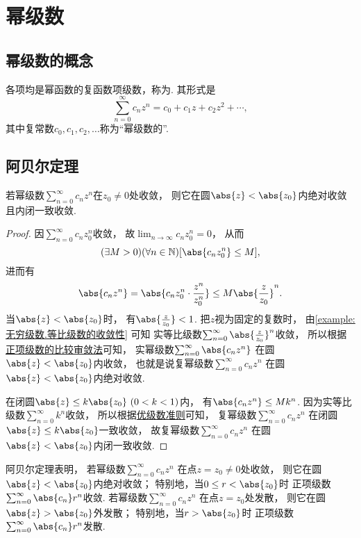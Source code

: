 \section{幂级数}
\subsection{幂级数的概念}
\begin{definition}
各项均是幂函数的复函数项级数，称为.
其形式是\begin{equation*}
	\sum_{n=0}^\infty c_n z^n
	= c_0 + c_1 z + c_2 z^2 + \dotsb,
\end{equation*}
其中复常数\(c_0,c_1,c_2,\dotsc\)称为“幂级数的”.
\end{definition}

\subsection{阿贝尔定理}
\begin{theorem}[阿贝尔定理]\label{theorem:解析函数的级数表示.阿贝尔定理}
若幂级数\(\sum_{n=0}^\infty c_n z^n\)在\(z_0 \neq 0\)处收敛，
则它在圆\(\abs{z} < \abs{z_0}\)内绝对收敛且内闭一致收敛.
\begin{proof}
因\(\sum_{n=0}^\infty c_n z_0^n\)收敛，
故\(\lim_{n\to\infty} c_n z_0^n = 0\)，
从而\begin{equation*}
	(\exists M > 0)
	(\forall n \in \mathbb{N})
	[\abs{c_n z_0^n} \leq M],
\end{equation*}
进而有\begin{equation*}
	\abs{c_n z^n}
	= \abs{c_n z_0^n \cdot \frac{z^n}{z_0^n}}
	\leq M \abs{\frac{z}{z_0}}^n.
\end{equation*}
当\(\abs{z} < \abs{z_0}\)时，
有\(\abs{\frac{z}{z_0}} < 1\).
把\(z\)视为固定的复数时，
由\cref{example:无穷级数.等比级数的收敛性} 可知
实等比级数\(\sum_{n=0}^\infty \abs{\frac{z}{z_0}}^n\)收敛，
所以根据\hyperref[theorem:无穷级数.正项级数的比较审敛法]{正项级数的比较审敛法}可知，
实幂级数\(\sum_{n=0}^\infty \abs{c_n z^n}\)
在圆\(\abs{z} < \abs{z_0}\)内收敛，
也就是说复幂级数\(\sum_{n=0}^\infty c_n z^n\)
在圆\(\abs{z} < \abs{z_0}\)内绝对收敛.

在闭圆\(\abs{z} \leq k \abs{z_0}\ (0<k<1)\)内，
有\(\abs{c_n z^n} \leq M k^n\).
因为实等比级数\(\sum_{n=0}^\infty k^n\)收敛，
所以根据\hyperref[theorem:无穷级数.优级数准则]{优级数准则}可知，
复幂级数\(\sum_{n=0}^\infty c_n z^n\)
在闭圆\(\abs{z} \leq k \abs{z_0}\)一致收敛，
故复幂级数\(\sum_{n=0}^\infty c_n z^n\)
在圆\(\abs{z} < \abs{z_0}\)内闭一致收敛.
\end{proof}
\end{theorem}
阿贝尔定理表明，
若幂级数\(\sum_{n=0}^\infty c_n z^n\)
在点\(z = z_0 \neq 0\)处收敛，
则它在圆\(\abs{z} < \abs{z_0}\)内绝对收敛；
特别地，当\(0 \leq r < \abs{z_0}\)时
正项级数\(\sum_{n=0}^\infty \abs{c_n} r^n\)收敛.
若幂级数\(\sum_{n=0}^\infty c_n z^n\)
在点\(z = z_0\)处发散，
则它在圆\(\abs{z} > \abs{z_0}\)外发散；
特别地，当\(r > \abs{z_0}\)时
正项级数\(\sum_{n=0}^\infty \abs{c_n} r^n\)发散.

